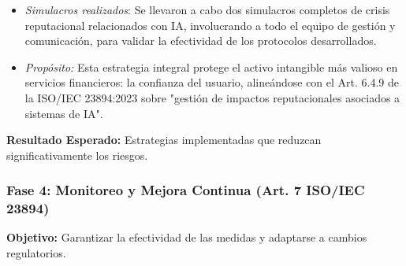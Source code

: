 \documentclass[12pt]{article}
\begin{document}
\begin{enumerate}
\begin{itemize}
\begin{itemize}
                \item \textbf{Plan de comunicación transparente}: Desarrollo de materiales educativos para usuarios finales sobre el funcionamiento, capacidades y limitaciones del asistente IA, incluyendo videos explicativos, guías interactivas y un micrositio dedicado a "IA Responsable en Walli".
                \item \textbf{Programa de comunicación de actualización}: Establecimiento de un protocolo para comunicar mejoras y actualizaciones del sistema a los usuarios, destacando específicamente las mejoras en seguridad y privacidad.
                \item \textbf{Plan de gestión de crisis específico para IA}: Creación de un manual detallado con 27 escenarios específicos de crisis relacionadas con IA (como filtración de datos, generación de consejos financieros incorrectos, o sesgo algorítmico) y los protocolos de respuesta correspondientes, incluyendo templates de comunicación, árboles de decisión para escalar incidentes, y roles y responsabilidades claras.
                \item \textbf{Sistema de monitoreo de reputación digital}: Implementación de una herramienta de sentiment analysis y social listening específicamente configurada para detectar menciones relativas a la funcionalidad de IA de Walli en redes sociales y medios digitales, con alertas automáticas ante detección de sentimientos negativos.
            \end{itemize}
            \item \textit{Simulacros realizados}: Se llevaron a cabo dos simulacros completos de crisis reputacional relacionados con IA, involucrando a todo el equipo de gestión y comunicación, para validar la efectividad de los protocolos desarrollados.
            \item \textit{Propósito:} Esta estrategia integral protege el activo intangible más valioso en servicios financieros: la confianza del usuario, alineándose con el Art. 6.4.9 de la ISO/IEC 23894:2023 sobre "gestión de impactos reputacionales asociados a sistemas de IA".
        \end{itemize}
\end{enumerate}

\textbf{Resultado Esperado:} Estrategias implementadas que reduzcan significativamente los riesgos.

\subsubsection{Fase 4: Monitoreo y Mejora Continua (Art. 7 ISO/IEC 23894)}
\textbf{Objetivo:} Garantizar la efectividad de las medidas y adaptarse a cambios regulatorios.
\end{document}
